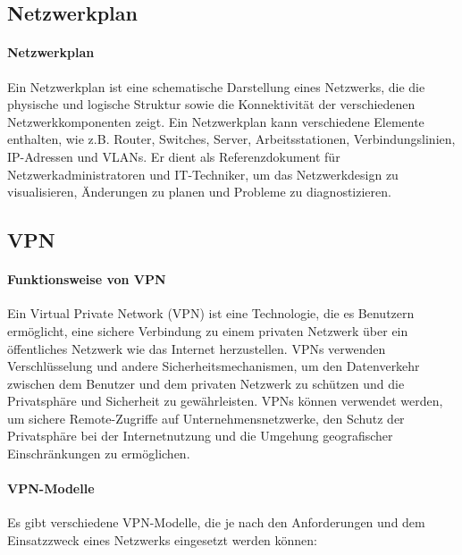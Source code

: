 \subsection{Netzwerkplan}

\paragraph{Netzwerkplan}

Ein Netzwerkplan ist eine schematische Darstellung eines Netzwerks, die die physische und logische Struktur sowie die Konnektivität der verschiedenen Netzwerkkomponenten zeigt. Ein Netzwerkplan kann verschiedene Elemente enthalten, wie z.B. Router, Switches, Server, Arbeitsstationen, Verbindungslinien, IP-Adressen und VLANs. Er dient als Referenzdokument für Netzwerkadministratoren und IT-Techniker, um das Netzwerkdesign zu visualisieren, Änderungen zu planen und Probleme zu diagnostizieren.

\subsection{VPN}

\paragraph{Funktionsweise von VPN}

Ein Virtual Private Network (VPN) ist eine Technologie, die es Benutzern ermöglicht, eine sichere Verbindung zu einem privaten Netzwerk über ein öffentliches Netzwerk wie das Internet herzustellen. VPNs verwenden Verschlüsselung und andere Sicherheitsmechanismen, um den Datenverkehr zwischen dem Benutzer und dem privaten Netzwerk zu schützen und die Privatsphäre und Sicherheit zu gewährleisten. VPNs können verwendet werden, um sichere Remote-Zugriffe auf Unternehmensnetzwerke, den Schutz der Privatsphäre bei der Internetnutzung und die Umgehung geografischer Einschränkungen zu ermöglichen.

\paragraph{VPN-Modelle}

Es gibt verschiedene VPN-Modelle, die je nach den Anforderungen und dem Einsatzzweck eines Netzwerks eingesetzt werden können:

